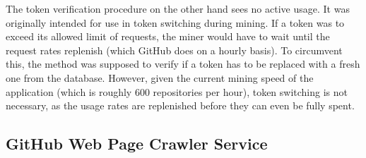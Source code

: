 The token verification procedure on the other hand sees no active usage.
It was originally intended for use in token switching during mining.
If a token was to exceed its allowed limit of requests, the miner would have to wait until the request rates replenish (which GitHub does on a hourly basis).
To circumvent this, the method was supposed to verify if a token has to be replaced with a fresh one from the database.
However, given the current mining speed of the application (which is roughly 600 repositories per hour), token switching is not necessary, as the usage rates are replenished before they can even be fully spent.

\subsection{GitHub Web Page Crawler Service}


